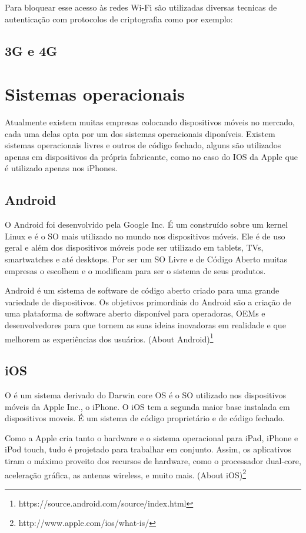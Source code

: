 Para bloquear esse acesso às redes Wi-Fi são utilizadas diversas tecnicas de autenticação com protocolos de criptografia como por exemplo: 
\subsection{3G e 4G}

\section{Sistemas operacionais}
Atualmente existem muitas empresas colocando dispositivos móveis no mercado, cada uma delas opta por um dos sistemas operacionais diponíveis.
Existem sistemas operacionais livres e outros de código fechado, alguns são utilizados apenas em dispositivos da própria fabricante, como no caso do IOS da Apple que é utilizado apenas nos iPhones.

\subsection{Android}
O Android foi desenvolvido pela Google Inc. É um  construído sobre um kernel Linux e é o SO mais utilizado no mundo nos dispositivos móveis. Ele é de uso geral e além dos dispositivos móveis pode ser utilizado em tablets, TVs, smartwatches e até desktops. Por ser um SO Livre e de Código Aberto muitas empresas o escolhem e o modificam para ser o sistema de seus produtos.

\begin{citacao}
Android é um sistema de software de código aberto criado para uma grande variedade de dispositivos. Os objetivos primordiais do Android são a criação de uma plataforma de software aberto disponível para operadoras, OEMs e desenvolvedores para que tornem as suas ideias inovadoras em realidade e que melhorem as experiências dos usuários. (About Android)\footnote{https://source.android.com/source/index.html}
\end{citacao}

\subsection{iOS}
O  é um sistema derivado do Darwin core OS é o SO utilizado nos dispositivos móveis da Apple Inc., o iPhone. O iOS tem a segunda maior base instalada em dispositivos moveis. É um sistema de código proprietário e de código fechado.

\begin{citacao}
Como a Apple cria tanto o hardware e o sistema operacional para iPad, iPhone e iPod touch, tudo é projetado para trabalhar em conjunto. Assim, os aplicativos tiram o máximo proveito dos recursos de hardware, como o processador dual-core, aceleração gráfica, as antenas wireless, e muito mais. (About iOS)\footnote{http://www.apple.com/ios/what-is/}
\end{citacao}

